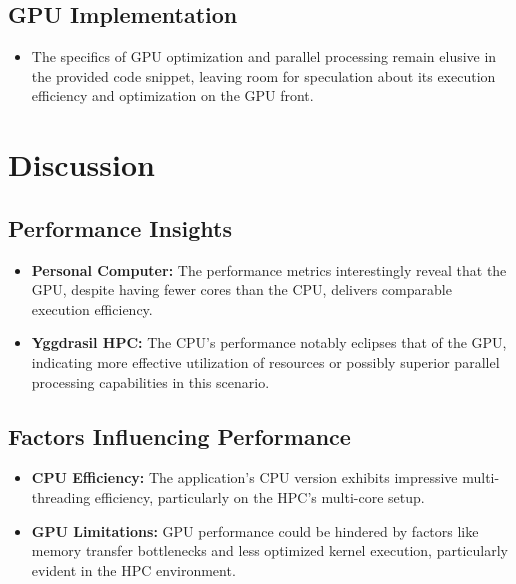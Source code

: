\documentclass[11pt]{article}
\begin{document}
    \hypertarget{gpu-implementation}{%
    \subsection{GPU Implementation}\label{gpu-implementation}}

    \begin{itemize}
    
    \item
    The specifics of GPU optimization and parallel processing remain
    elusive in the provided code snippet, leaving room for speculation
    about its execution efficiency and optimization on the GPU front.
    \end{itemize}

    \hypertarget{discussion}{%
    \section{Discussion}\label{discussion}}

    \hypertarget{performance-insights}{%
    \subsection{Performance Insights}\label{performance-insights}}

    \begin{itemize}
    
    \item
    \textbf{Personal Computer:} The performance metrics interestingly
    reveal that the GPU, despite having fewer cores than the CPU, delivers
    comparable execution efficiency.
    \item
    \textbf{Yggdrasil HPC:} The CPU's performance notably eclipses that of
    the GPU, indicating more effective utilization of resources or
    possibly superior parallel processing capabilities in this scenario.
    \end{itemize}

    \hypertarget{factors-influencing-performance}{%
    \subsection{Factors Influencing
    Performance}\label{factors-influencing-performance}}

    \begin{itemize}
    
    \item
    \textbf{CPU Efficiency:} The application's CPU version exhibits
    impressive multi-threading efficiency, particularly on the HPC's
    multi-core setup.
    \item
    \textbf{GPU Limitations:} GPU performance could be hindered by factors
    like memory transfer bottlenecks and less optimized kernel execution,
    particularly evident in the HPC environment.
    \end{itemize}
\end{document}

